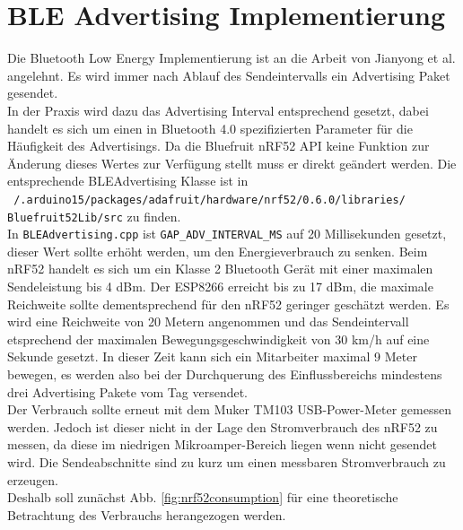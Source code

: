 \section{BLE Advertising Implementierung}
\label{ch:phase3:sec:advertising}
Die Bluetooth Low Energy Implementierung ist an die Arbeit von Jianyong et al. angelehnt.
Es wird immer nach Ablauf des Sendeintervalls ein Advertising Paket gesendet.\\
In der Praxis wird dazu das Advertising Interval entsprechend gesetzt, dabei handelt es sich um einen in Bluetooth 4.0 spezifizierten Parameter für die Häufigkeit des Advertisings.
Da die Bluefruit nRF52 API keine Funktion zur Änderung dieses Wertes zur Verfügung stellt muss er direkt geändert werden.
Die entsprechende BLEAdvertising Klasse ist in \\\texttt{~/.arduino15/packages/adafruit/hardware/nrf52/0.6.0/libraries/}\\\texttt{Bluefruit52Lib/src} zu finden. \\
In \texttt{BLEAdvertising.cpp} ist \texttt{GAP\_ADV\_INTERVAL\_MS} auf 20 Millisekunden gesetzt, dieser Wert sollte erhöht werden, um den Energieverbrauch zu senken.
Beim nRF52 handelt es sich um ein Klasse 2 Bluetooth Gerät mit einer maximalen Sendeleistung bis 4 dBm.
Der ESP8266 erreicht bis zu 17 dBm, die maximale Reichweite sollte dementsprechend für den nRF52 geringer geschätzt werden.
Es wird eine Reichweite von 20 Metern angenommen und das Sendeintervall etsprechend der maximalen Bewegungsgeschwindigkeit von 30 km/h auf eine Sekunde gesetzt. 
In dieser Zeit kann sich ein Mitarbeiter maximal 9 Meter bewegen, es werden also bei der Durchquerung des Einflussbereichs mindestens drei Advertising Pakete vom Tag versendet.\\
Der Verbrauch sollte erneut mit dem Muker TM103 USB-Power-Meter gemessen werden.
Jedoch ist dieser nicht in der Lage den Stromverbrauch des nRF52 zu messen, da diese im niedrigen Mikroamper-Bereich liegen wenn nicht gesendet wird.
Die Sendeabschnitte sind zu kurz um einen messbaren Stromverbrauch zu erzeugen.\\
Deshalb soll zunächst Abb. \ref{fig:nrf52consumption} für eine theoretische Betrachtung des Verbrauchs herangezogen werden. 

